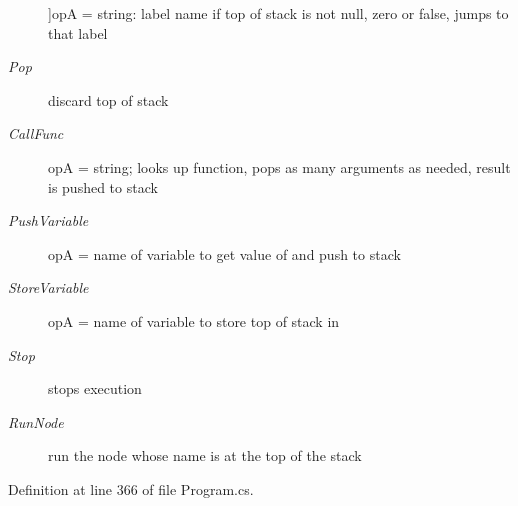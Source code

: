 \begin{Desc}
\begin{description}
{}]op\-A = string\-: label name if top of stack is not null, zero or false, jumps to that label \item[{\em 
\hypertarget{a00053_ad5dfb6ee68ca7469623ad3e459f98894a0ae61bd0474e04c9f1195d4baa0213a0}{Pop}\label{a00053_ad5dfb6ee68ca7469623ad3e459f98894a0ae61bd0474e04c9f1195d4baa0213a0}
}]discard top of stack \item[{\em 
\hypertarget{a00053_ad5dfb6ee68ca7469623ad3e459f98894a3b5e7e8300dc6e4b78cb865c5b10f01a}{Call\-Func}\label{a00053_ad5dfb6ee68ca7469623ad3e459f98894a3b5e7e8300dc6e4b78cb865c5b10f01a}
}]op\-A = string; looks up function, pops as many arguments as needed, result is pushed to stack \item[{\em 
\hypertarget{a00053_ad5dfb6ee68ca7469623ad3e459f98894ab8c46f65015a178516fadbb5ad6c2038}{Push\-Variable}\label{a00053_ad5dfb6ee68ca7469623ad3e459f98894ab8c46f65015a178516fadbb5ad6c2038}
}]op\-A = name of variable to get value of and push to stack \item[{\em 
\hypertarget{a00053_ad5dfb6ee68ca7469623ad3e459f98894a872dc050abaff4beb46e70dadd4088c2}{Store\-Variable}\label{a00053_ad5dfb6ee68ca7469623ad3e459f98894a872dc050abaff4beb46e70dadd4088c2}
}]op\-A = name of variable to store top of stack in \item[{\em 
\hypertarget{a00053_ad5dfb6ee68ca7469623ad3e459f98894a11a755d598c0c417f9a36758c3da7481}{Stop}\label{a00053_ad5dfb6ee68ca7469623ad3e459f98894a11a755d598c0c417f9a36758c3da7481}
}]stops execution \item[{\em 
\hypertarget{a00053_ad5dfb6ee68ca7469623ad3e459f98894ae956bcf888278c168ee9b106927ff6ac}{Run\-Node}\label{a00053_ad5dfb6ee68ca7469623ad3e459f98894ae956bcf888278c168ee9b106927ff6ac}
}]run the node whose name is at the top of the stack \end{description}
\end{Desc}


Definition at line 366 of file Program.\-cs.


